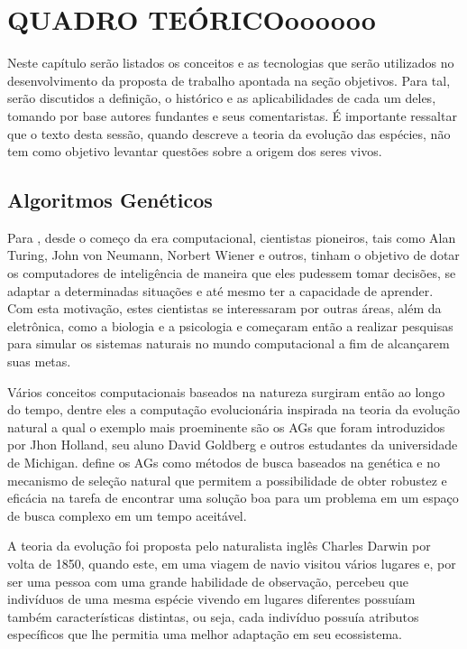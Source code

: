 \chapter{QUADRO TEÓRICOoooooo}

\par Neste capítulo serão listados os conceitos e as tecnologias que serão
utilizados no desenvolvimento da proposta de trabalho apontada na seção 
objetivos. Para tal, serão discutidos a definição, o histórico e as 
aplicabilidades de cada um deles, tomando por base autores fundantes e 
seus comentaristas. É importante ressaltar que o texto desta sessão, quando
descreve a teoria da evolução das espécies, não tem como objetivo levantar
questões sobre a origem dos seres vivos.

\section{Algoritmos Genéticos}


\par Para , desde o começo da
era computacional, cientistas pioneiros, tais como Alan Turing, John von
Neumann, Norbert Wiener e outros, tinham o objetivo de dotar os computadores de inteligência
de maneira que eles pudessem tomar decisões, se adaptar a determinadas situações
e até mesmo ter a capacidade de aprender. Com esta motivação, estes cientistas
se interessaram por outras áreas, além da eletrônica, como  a
biologia e a psicologia e começaram então a realizar pesquisas para simular os
sistemas naturais no mundo computacional a fim de alcançarem suas metas. 

\par Vários conceitos computacionais baseados na natureza surgiram então ao
longo do tempo, dentre eles a computação evolucionária inspirada na teoria da evolução natural
a qual o exemplo mais proeminente são os AGs que foram introduzidos por Jhon Holland, seu aluno
David Goldberg e outros estudantes da universidade de Michigan.
 define os AGs como métodos de busca baseados na
genética e no mecanismo de seleção natural que permitem a possibilidade de obter
robustez e eficácia na tarefa de encontrar uma solução boa para um problema em um espaço de busca
complexo em um tempo aceitável.


\par A teoria da evolução foi proposta pelo naturalista inglês Charles
Darwin por volta de 1850, quando este, em uma viagem de navio visitou vários lugares e, 
por ser uma pessoa com uma grande habilidade de  observação, percebeu que
indivíduos de uma mesma espécie vivendo em lugares diferentes possuíam também
características distintas, ou seja, cada indivíduo  possuía atributos
específicos que lhe permitia uma melhor adaptação em seu ecossistema. 


